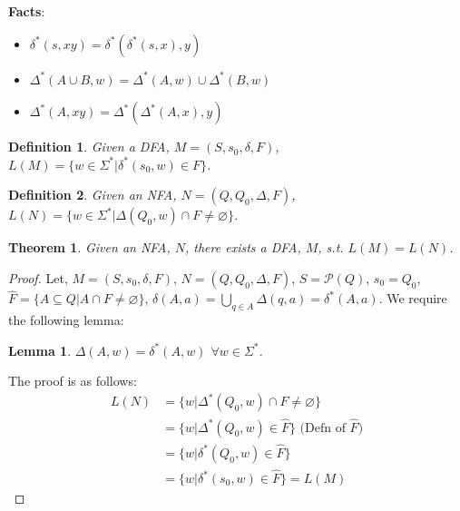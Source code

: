 \documentclass{article}
\newtheorem{theorem}{Theorem}
\newtheorem{definition}{Definition}
\newtheorem{lemma}{Lemma}
\begin{document}
\noindent\textbf{Facts}:
\begin{itemize}
    \item $\delta^* (s, xy) = \delta^*(\delta^*(s,x),y)$
    \item $\Delta^*(A \cup B,w) = \Delta^*(A,w) \cup \Delta^*(B,w)$
    \item $\Delta^*(A,xy) = \Delta^*(\Delta^*(A,x), y)$
\end{itemize}
\begin{definition}
Given a DFA, $M = (S,s_0,\delta,F)$, $L(M) = \{w \in \Sigma^* | \delta^*(s_0,w) \in F\}$.
\end{definition}
\begin{definition}
Given an NFA, $N = (Q,Q_0,\Delta,F)$, $L(N) = \{w \in \Sigma^* | \Delta(Q_0,w) \cap F \ne \varnothing\}$.
\end{definition}
\begin{theorem}
Given an NFA, $N$, there exists a DFA, $M$, s.t. $L(M) = L(N)$.
\end{theorem}
\begin{proof}
Let, $M = (S,s_0,\delta,F)$, $N = (Q,Q_0,\Delta,F)$, $S = \mathcal{P}(Q)$, $s_0 = Q_0$, $\hat{F} = \{A \subseteq Q | A \cap F \ne \varnothing\}$, $\delta(A,a) = \bigcup_{q \in A}\Delta(q,a) = \delta^*(A,a)$. We require the following lemma:
\begin{lemma}
$\Delta(A,w) = \delta^*(A,w)$ $\forall w \in \Sigma^*$.
\end{lemma}
\noindent The proof is as follows:
\begin{align*}
    L(N) &= \{w | \Delta^*(Q_0,w) \cap F \ne \varnothing\}\\
    &= \{w | \Delta^*(Q_0,w) \in \hat{F}\} \text{ (Defn of }\hat{F})\\
    &= \{w | \delta^*(Q_0,w) \in \hat{F}\}\\
    &= \{w | \delta^*(s_0,w) \in \hat{F}\} = L(M)
\end{align*}
\end{proof}
\end{document}
